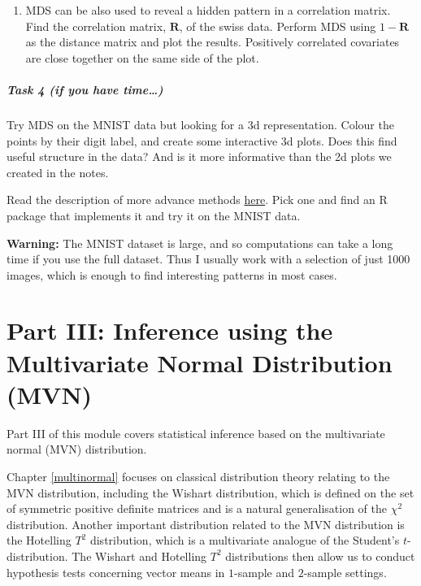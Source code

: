 \documentclass[
]{book}
\providecommand{\tightlist}{%
  \setlength{\itemsep}{0pt}\setlength{\parskip}{0pt}}
\theoremstyle{definition}
\theoremstyle{definition}
\theoremstyle{definition}
\theoremstyle{definition}
\theoremstyle{remark}
\begin{document}
\begin{enumerate}
\def\labelenumi{\roman{enumi}.}
\setcounter{enumi}{2}
\tightlist
\item
  MDS can be also used to reveal a hidden pattern in a correlation matrix. Find the correlation matrix, \(\mathbf R\), of the swiss data. Perform MDS using \(1-\mathbf R\) as the distance matrix and plot the results. Positively correlated covariates are close together on the same side of the plot.
\end{enumerate}

\hypertarget{task-4-if-you-have-time}{%
\paragraph*{Task 4 (if you have time\ldots)}\label{task-4-if-you-have-time}}

Try MDS on the MNIST data but looking for a 3d representation. Colour the points by their digit label, and create some interactive 3d plots. Does this find useful structure in the data? And is it more informative than the 2d plots we created in the notes.

Read the description of more advance methods \href{https://colah.github.io/posts/2014-10-Visualizing-MNIST/}{here}. Pick one and find an R package that implements it and try it on the MNIST data.

\textbf{Warning:} The MNIST dataset is large, and so computations can take a long time if you use the full dataset. Thus I usually work with a selection of just 1000 images, which is enough to find interesting patterns in most cases.

\hypertarget{part-iii-inference-using-the-multivariate-normal-distribution-mvn}{%
\chapter*{Part III: Inference using the Multivariate Normal Distribution (MVN)}\label{part-iii-inference-using-the-multivariate-normal-distribution-mvn}}

Part III of this module covers statistical inference based on the multivariate normal (MVN) distribution.

Chapter \ref{multinormal} focuses on classical distribution theory relating to the MVN distribution, including the Wishart distribution, which is defined on the set of symmetric positive definite matrices and is a natural generalisation of the \(\chi^2\) distribution. Another important distribution related to the MVN distribution is the Hotelling \(T^2\) distribution, which is a multivariate analogue of the Student's \(t\)-distribution.
The Wishart and Hotelling \(T^2\) distributions then allow us to conduct hypothesis tests concerning vector means in \(1\)-sample and \(2\)-sample settings.
\end{document}

